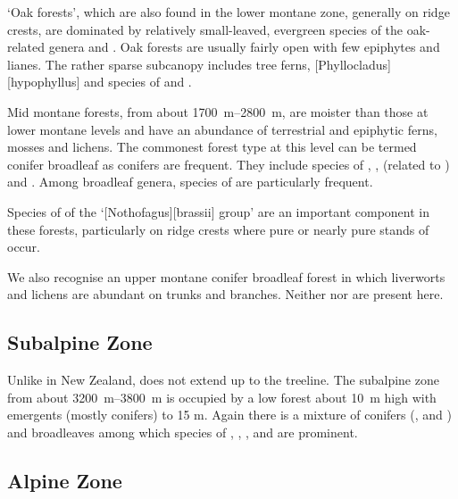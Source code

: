 `Oak forests', which are also found in the lower montane zone, generally on ridge crests, are dominated by relatively small-leaved, evergreen species of the oak-related genera  and .
Oak forests are usually fairly open with few epiphytes and lianes.
The rather sparse subcanopy includes tree ferns, [Phyllocladus][hypophyllus] and species of  and .

Mid montane forests, from about \SIrange{1700}{2800}{\metre}, are moister than those at lower montane levels and have an abundance of terrestrial and epiphytic ferns, mosses and lichens.
The commonest forest type at this level can be termed conifer broadleaf as conifers are frequent.
They include species of , ,  (related to ) and .
Among broadleaf genera, species of  are particularly frequent.

Species of  of the `[Nothofagus][brassii] group' are an important component in these forests, particularly on ridge crests where pure or nearly pure stands of  occur.

We also recognise an upper montane conifer broadleaf forest in which liverworts and lichens are abundant on trunks and branches.
Neither  nor  are present here.

\subsection{Subalpine Zone}

Unlike in New Zealand,  does not extend up to the treeline.
The subalpine zone from about \SIrange{3200}{3800}{\metre} is occupied by a low forest about \SI{10}{\metre} high with emergents (mostly conifers) to 15 m.
Again there is a mixture of conifers (,  and ) and broadleaves among which species of , , ,  and  are prominent.

\subsection{Alpine Zone}


